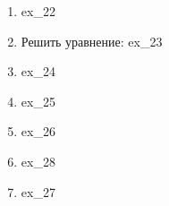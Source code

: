 \documentclass[12pt, a4paper]{article}
\begin{document}
   \cfoot{}
\begin{enumerate}
	\item {ex_22}
	\item Решить уравнение: {ex_23}
	\item {ex_24}
	\item {ex_25}
	\item {ex_26}
	\item {ex_28}
	\item {ex_27}
\end{enumerate}
\end{document}
